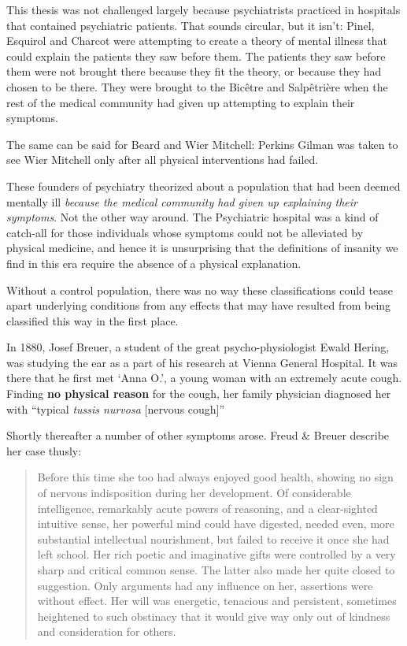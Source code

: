 \begin{refsection}
This thesis was not challenged largely because psychiatrists practiced in hospitals that contained psychiatric patients. That sounds circular, but it isn't: Pinel, Esquirol and Charcot were attempting to create a theory of mental illness that could explain the patients they saw before them. The patients they saw before them were not brought there because they fit the theory, or because they had chosen to be there. They were brought to the Bicêtre and Salpêtrière when the rest of the medical community had given up attempting to explain their symptoms.

The same can be said for Beard and Wier Mitchell: Perkins Gilman was taken to see Wier Mitchell only after all physical interventions had failed.

These founders of psychiatry theorized about a population that had been deemed mentally ill \emph{because the medical community had given up explaining their symptoms}. Not the other way around. The Psychiatric hospital was a kind of catch-all for those individuals whose symptoms could not be alleviated by physical medicine, and hence it is unsurprising that the definitions of insanity we find in this era require the absence of a physical explanation.

Without a control population, there was no way these classifications could tease apart underlying conditions from any effects that may have resulted from being classified this way in the first place. 

In 1880, Josef Breuer, a student of the great psycho-physiologist Ewald Hering, was studying the ear as a part of his research at Vienna General Hospital. It was there that he first met `Anna O.', a young woman with an extremely acute cough. Finding \textbf{no physical reason} for the cough, her family physician diagnosed her with ``typical \emph{tussis nurvosa} [nervous cough]'' ~\citep[p 27]{Freud:kVwxqGOZ} 

Shortly thereafter a number of other symptoms arose. Freud \& Breuer describe her case thusly:

\begin{quote}

Before this time she too had always enjoyed good health, showing no sign of nervous indisposition during her development. Of considerable intelligence, remarkably acute powers of reasoning, and a clear-sighted intuitive sense, her powerful mind could have digested, needed even, more substantial intellectual nourishment, but failed to receive it once she had left school. Her rich poetic and imaginative gifts were controlled by a very sharp and critical common sense. The latter also made her quite closed to suggestion. Only arguments had any influence on her, assertions were without effect. Her will was energetic, tenacious and persistent, sometimes heightened to such obstinacy that it would give way only out of kindness and consideration for others.


\end{quote}
\end{refsection}

